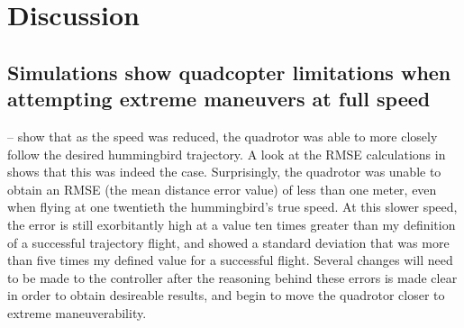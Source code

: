 \documentclass[onecolumn,10pt]{IEEEtran}
\begin{document}
\clearpage
\section{Discussion}
\subsection{Simulations show quadcopter limitations when attempting extreme maneuvers at full speed}
-- show that as the speed was reduced, the quadrotor was able to more closely follow the desired hummingbird trajectory. A look at the RMSE calculations in  shows that this was indeed the case. Surprisingly, the quadrotor was unable to obtain an RMSE (the mean distance error value) of less than one meter, even when flying at one twentieth the hummingbird's true speed. At this slower speed, the error is still exorbitantly high at a value ten times greater than my definition of a successful trajectory flight, and showed a standard deviation that was more than five times my defined value for a successful flight. Several changes will need to be made to the controller after the reasoning behind these errors is made clear in order to obtain desireable results, and begin to move the quadrotor closer to extreme maneuverability.

\end{document}
